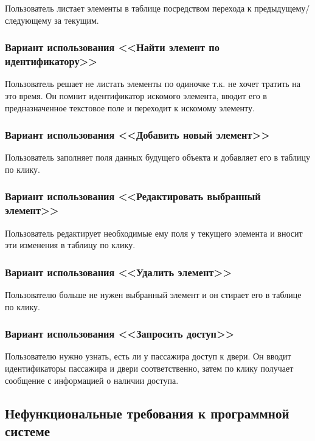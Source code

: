 Пользователь листает элементы в таблице посредством перехода к предыдущему/следующему за текущим.

\subsubsection{Вариант использования <<Найти элемент по идентификатору>>}

Пользователь решает не листать элементы по одиночке т.к. не хочет тратить на это время. Он помнит идентификатор искомого элемента, вводит его в предназначенное текстовое поле и переходит к искомому элементу.

\subsubsection{Вариант использования <<Добавить новый элемент>>}

Пользователь заполняет поля данных будущего объекта и добавляет его в таблицу по клику.

\subsubsection{Вариант использования <<Редактировать выбранный элемент>>}

Пользователь редактирует необходимые ему поля у текущего элемента и вносит эти изменения в таблицу по клику.

\subsubsection{Вариант использования <<Удалить элемент>>}

Пользователю больше не нужен выбранный элемент и он стирает его в таблице по клику.

\subsubsection{Вариант использования <<Запросить доступ>>}

Пользователю нужно узнать, есть ли у пассажира доступ к двери. Он вводит идентификаторы пассажира и двери соответственно, затем по клику получает сообщение с информацией о наличии доступа.

\subsection {Нефункциональные требования к программной системе}
